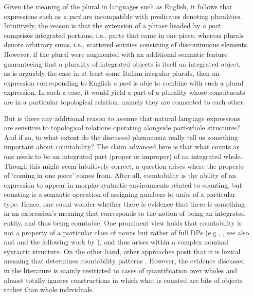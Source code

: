 Given the meaning of the plural in languages such as English, it follows that expressions such as \textit{a part} are incompatible with predicates denoting pluralities. Intuitively, the reason is that the extension of a phrase headed by \textit{a part} comprises integrated portions, i.e., parts that come in one piece, whereas plurals denote arbitrary sums, i.e., scattered entities consisting of discontinuous elements. However, if the plural were augmented with an additional semantic feature guaranteeing that a plurality of integrated objects is itself an integrated object, as is arguably the case in at least some Italian irregular plurals, then an expression corresponding to English \textit{a part} is able to combine with such a plural expression. In such a case, it would yield a part of a plurality whose constituents are in a particular topological relation, namely they are connected to each other.

But is there any additional reason to assume that natural language expressions are sensitive to topological relations operating alongside part-whole structures? And if so, to what extent do the discussed phenomena really tell us something important about countability? The claim advanced here is that what counts as one needs to be an integrated part (proper or improper) of an integrated whole. Though this might seem intuitively correct, a question arises where the property of `coming in one piece' comes from. After all, countability is the ability of an expression to appear in morpho-syntactic environments related to counting, but counting is a semantic operation of assigning numbers to units of a particular type. Hence, one could wonder whether there is evidence that there is something in an expression's meaning that corresponds to the notion of being an integrated entity, and thus being countable. One prominent view holds that countability is not a property of a particular class of nouns but rather of full DPs (e.g., \citealt{borer2005name}, see also \citealt{allan1980nouns} and \citealt{pelletier_schubert1989mass} and the following work by \citeauthor{pelletier2011descriptive}), and thus arises within a complex nominal syntactic structure. On the other hand, other approaches posit that it is lexical meaning that determines countability patterns  \citep[e.g.,][]{wierzbicka1988semantics,wisniewski_lamb_middleteon2003conceptual}. However, the evidence discussed in the literature is mainly restricted to cases of quantification over wholes and almost totally ignores constructions in which what is counted are bits of objects rather than whole individuals.


